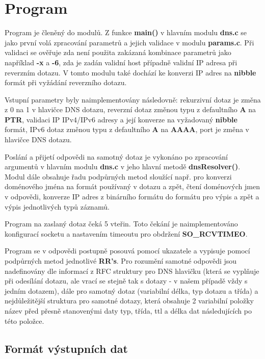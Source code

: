 \documentclass[a4paper,11pt]{article}
\begin{document}
\section{Program}

Program je členěný do modulů. Z funkce \textbf{main()} v hlavním modulu \textbf{dns.c} se jako první volá zpracování parametrů a jejich validace v modulu \textbf{params.c}. Při validaci se ověřuje zda není použita zakázaná kombinace parametrů jako například \textbf{-x} a \textbf{-6}, zda je zadán validní host případně validní IP adresa při reverzním dotazu. V tomto modulu také dochází ke konverzi IP adres na \textbf{nibble} formát při vyžádání reverzního dotazu.

Vstupní parametry byly naimplementovány následovně: rekurzivní dotaz je změna z 0 na 1 v hlavičce DNS dotazu, reverzní dotaz změnou typu z defaultního \textbf{A} na \textbf{PTR}, validaci IP IPv4/IPv6 adresy a její konverze na vyžadovaný \textbf{nibble} formát, IPv6 dotaz změnou typu z defaultního \textbf{A} na \textbf{AAAA}, port je změna v hlavičce DNS dotazu.

Poslání a přijetí odpovědi na samotný dotaz je vykonáno po zpracování argumentů v hlavním modulu \textbf{dns.c} v jeho hlavní metodě \textbf{dnsResolver()}. Modul dále obsahuje řadu podpůrných metod sloužící např. pro konverzi doménového jména na formát používaný v dotazu a zpět, čtení doménových jmen v odpovědi, konverze IP adres z binárního formátu do formátu pro výpis a zpět a výpis jednotlivých typů záznamů.

Program na zaslaný dotaz čeká 5 vteřin. Toto čekání je naimplementováno konfigurací socketu a nastavením timeoutu pro obdržení \textbf{SO\_RCVTIMEO}.

Program se v odpovědi postupně posouvá pomocí ukazatele a vypisuje pomocí podpůrných metod jednotlivé \textbf{RR's}. Pro rozumění samotné odpovědi jsou nadefinovány dle informací z RFC\cite{rfc10135} struktury pro DNS hlavičku (která se vyplňuje při odesílání dotazu, ale vrací se stejně tak s dotazy - v našem případě vždy s jedním dotazem), dále pro samotný dotaz (variabilní délka, typ dotazu a třída) a nejdůležitější struktura pro samotné dotazy, která obsahuje 2 variabilní položky název před přesně stanovenými daty typ, třída, ttl a délka dat následujících po této položce. 

\subsection{Formát výstupních dat}
\end{document}
